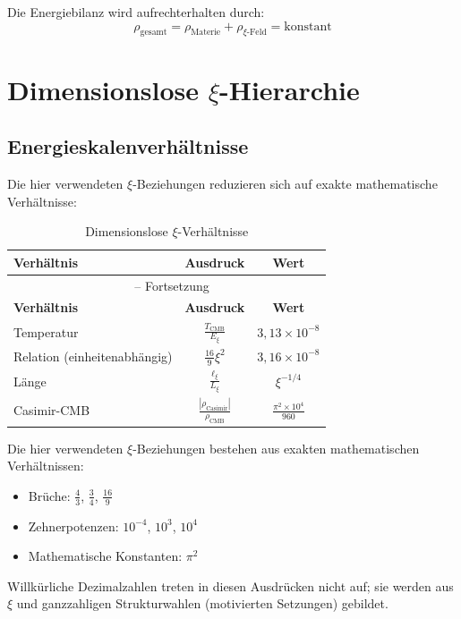 	Die Energiebilanz wird aufrechterhalten durch:
	\begin{equation}
		\rho_{\text{gesamt}} = \rho_{\text{Materie}} + \rho_{\xi\text{-Feld}} = \text{konstant}
	\end{equation}
	
	\section{Dimensionslose $\xi$-Hierarchie}
	
	\subsection{Energieskalenverhältnisse}
	
	Die hier verwendeten $\xi$-Beziehungen reduzieren sich auf exakte mathematische Verhältnisse:
	
	\begin{longtable}{lcc}
		\caption{Dimensionslose $\xi$-Verhältnisse} \\
		\toprule
		\textbf{Verhältnis} & \textbf{Ausdruck} & \textbf{Wert} \\
		\midrule
		\endfirsthead
		\multicolumn{3}{c}{\tablename\ \thetable{} -- Fortsetzung} \\
		\toprule
		\textbf{Verhältnis} & \textbf{Ausdruck} & \textbf{Wert} \\
		\midrule
		\endhead
		Temperatur & $\frac{T_{\text{CMB}}}{E_\xi}$ & $3{,}13 \times 10^{-8}$ \\
		Relation (einheitenabhängig) & $\frac{16}{9}\xi^2$ & $3{,}16 \times 10^{-8}$ \\
		Länge & $\frac{\ell_{\xi}}{L_\xi}$ & $\xi^{-1/4}$ \\
		Casimir-CMB & $\frac{|\rho_{\text{Casimir}}|}{\rho_{\text{CMB}}}$ & $\frac{\pi^2 \times 10^4}{960}$ \\
		\bottomrule
	\end{longtable}
	
	\begin{important}
		Die hier verwendeten $\xi$-Beziehungen bestehen aus exakten mathematischen Verhältnissen:
		\begin{itemize}
			\item Brüche: $\frac{4}{3}$, $\frac{3}{4}$, $\frac{16}{9}$
			\item Zehnerpotenzen: $10^{-4}$, $10^3$, $10^4$
			\item Mathematische Konstanten: $\pi^2$
		\end{itemize}
		Willkürliche Dezimalzahlen treten in diesen Ausdrücken nicht auf; sie werden aus $\xi$ und ganzzahligen Strukturwahlen (motivierten Setzungen) gebildet.
	\end{important}
	

